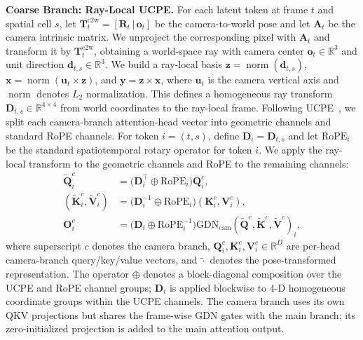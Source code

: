 \documentclass{llmxive}
\begin{document}
\noindent \textbf{Coarse Branch: Ray-Local UCPE.}
For each latent token at frame $t$ and spatial cell $s$, let $\mathbf{T}^{\mathrm{c2w}}_t=[\mathbf{R}_t\,|\,\mathbf{o}_t]$ be the camera-to-world pose and let $\mathbf{A}_t$ be the camera intrinsic matrix.
We unproject the corresponding pixel with $\mathbf{A}_t$ and transform it by $\mathbf{T}^{\mathrm{c2w}}_t$, obtaining a world-space ray with camera center $\mathbf{o}_{t}\in\mathbb{R}^{3}$ and unit direction $\mathbf{d}_{t,s}\in\mathbb{R}^{3}$.
We build a ray-local basis $\mathbf{z}=\operatorname{norm}(\mathbf{d}_{t,s})$, $\mathbf{x}=\operatorname{norm}(\mathbf{u}_{t}\times\mathbf{z})$, and $\mathbf{y}=\mathbf{z}\times\mathbf{x}$, where $\mathbf{u}_{t}$ is the camera vertical axis and $\operatorname{norm}$ denotes $L_2$ normalization.
This defines a homogeneous ray transform $\mathbf{D}_{t,s}\in\mathbb{R}^{4\times4}$ from world coordinates to the ray-local frame.
Following UCPE~\citep{ucpe}, we split each camera-branch attention-head vector into geometric channels and standard RoPE channels.
For token $i=(t,s)$, define $\mathbf{D}_i=\mathbf{D}_{t,s}$ and let $\mathrm{RoPE}_i$ be the standard spatiotemporal rotary operator for token $i$.
We apply the ray-local transform to the geometric channels and RoPE to the remaining channels:
\begin{equation}
\begin{aligned}
\widetilde{\mathbf{Q}}^{c}_{i} &=
  \big(\mathbf{D}_{i}^{\top}\oplus \mathrm{RoPE}_{i}\big)\mathbf{Q}^{c}_{i},\\
(\widetilde{\mathbf{K}}^{c}_{i},\widetilde{\mathbf{V}}^{c}_{i}) &=
  \big(\mathbf{D}_{i}^{-1}\oplus \mathrm{RoPE}_{i}\big)(\mathbf{K}^{c}_{i},\mathbf{V}^{c}_{i}),\\
\mathbf{O}^{c}_{i} &=
  \big(\mathbf{D}_{i}\oplus \mathrm{RoPE}_{i}^{-1}\big)
  \mathrm{GDN}_{\mathrm{cam}}(\widetilde{\mathbf{Q}}^{c},\widetilde{\mathbf{K}}^{c},\widetilde{\mathbf{V}}^{c})_{i},
\end{aligned}
\label{eq:ucpe_camera_branch}
\end{equation}
where superscript $c$ denotes the camera branch, $\mathbf{Q}^c_i,\mathbf{K}^c_i,\mathbf{V}^c_i\in\mathbb{R}^{D}$ are per-head camera-branch query/key/value vectors, and $\widetilde{\cdot}$ denotes the pose-transformed representation.
The operator $\oplus$ denotes a block-diagonal composition over the UCPE and RoPE channel groups; $\mathbf{D}_i$ is applied blockwise to 4-D homogeneous coordinate groups within the UCPE channels.
The camera branch uses its own QKV projections but shares the frame-wise GDN gates with the main branch; its zero-initialized projection is added to the main attention output.
\end{document}
